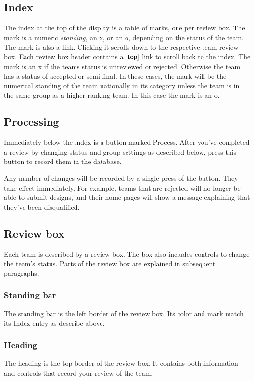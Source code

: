 \documentclass[11pt,letterpaper]{refart}
\def\ui#1{\textsf{#1}}
\begin{document}
\subsection{Index}
The index at the top of the display is a table of marks, one per review box.  The 
mark is a numeric \emph{standing}, an \ui{x}, or an \ui{o}, depending on the status of
the team.  The mark is also a link.  Clicking it scrolls down to the respective team
review box.  Each review box header contains a $[\hbox{\ui{top}}]$ link to scroll
back to the index.  The mark is an \ui{x} if the teams status is unreviewed or
rejected.  Otherwise the team has a status of accepted or semi-final.  In these 
cases, the mark will be the numerical standing of the team nationally in its
category unless the team is in the same group as a higher-ranking team.  In this
case the mark is an \ui{o}.

\subsection{Processing}
Immediately below the index is a button marked \ui{Process}.  After you've 
completed a review by changing status and group settings as described below,
press this button to record them in the database.  

Any number of changes will be recorded by a single press of the button.
They take effect immediately. For example, teams that are rejected will no longer be 
able to submit designs, and their home pages will show a message explaining that 
they've been disqualified.

\subsection{Review box}
Each team is described by a review box.  The box also includes controls to change
the team's status.  Parts of the review box are explained in subsequent paragraphs.

\subsubsection{Standing bar}
The standing bar is the left border of the review box.  Its color and mark match
its Index entry as describe above.  

\subsubsection{Heading}
The heading is the top border of the review box.  It contains both information
and controls that record your review of the team.  
\end{document}
